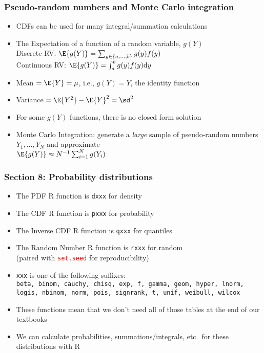\documentclass[11pt,pdftex,dvipsnames,usenames,helvetica]{beamer}
\begin{document}
\begin{frame}
\frametitle{Pseudo-random numbers and Monte Carlo integration }

\begin{itemize}
\item CDFs can be used for many integral/summation calculations
\item The Expectation of a function of a random variable, $g(Y)$\\ 
Discrete RV: $\E{g(Y)} = \sum_{y \in \{a, \ldots, b\}} g(y) f(y)$\\ 
Continuous RV: $\E{g(Y)} = \int_{a}^{b} g(y) f(y) \mathrm{d} y$
\item Mean $=\E{Y}=\mu$, i.e., $g(Y)=Y$, the identity function
\item Variance $=\E{Y^2}-\E{Y}^2=\sd^2$
\item For some $g(Y)$ functions, there is no closed form solution
\item Monte Carlo Integration: 
generate a {\it large} sample of pseudo-random numbers $Y_1, \dots, Y_N$
and approximate \\
$\E{g(Y)} \approx N^{-1}\sum_{i=1}^N g(Y_i)$ 
\end{itemize}

\end{frame} 

\begin{frame}
\frametitle{Section 8: Probability distributions }

\begin{itemize}
\item The PDF R function is {\tt dxxx} for density
\item The CDF R function is {\tt pxxx} for probability
\item The Inverse CDF R function is {\tt qxxx} for quantiles
\item The Random Number R function is {\tt rxxx} for random\\
(paired with \textcolor{red}{\tt set.seed} for reproducibility)
\item {\tt xxx} is one of the following suffixes:\\
{\tt beta, binom, cauchy, chisq, exp, f, gamma, geom, hyper, lnorm, logis, nbinom, norm, pois, signrank, t, unif, weibull, wilcox}
\item These functions mean that we don't need all of those tables at
  the end of our textbooks
\item We can calculate probabilities,
  summations/integrals, etc.\ for these distributions with R
 \end{itemize}

\end{frame} 
\end{document}
